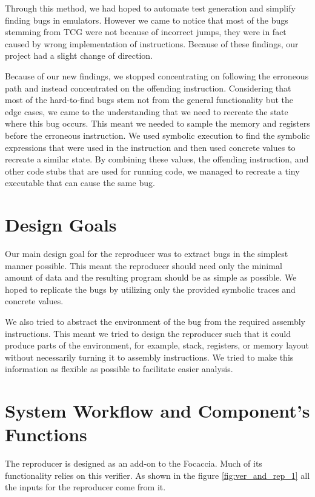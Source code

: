 Through this method, we had hoped to automate test generation and simplify finding bugs in emulators.
However we came to notice that most of the bugs stemming from \ac{TCG} were not because of incorrect jumps, they were in fact caused by wrong implementation of instructions.
Because of these findings, our project had a slight change of direction.

Because of our new findings, we stopped concentrating on following the erroneous path and instead concentrated on the offending instruction.
Considering that most of the hard-to-find bugs stem not from the general functionality but the edge cases, we came to the understanding that we need to recreate the state where this bug occurs.
This meant we needed to sample the memory and registers before the erroneous instruction.
We used symbolic execution to find the symbolic expressions that were used in the instruction and then used concrete values to recreate a similar state.
By combining these values, the offending instruction, and other code stubs that are used for running code, we managed to recreate a tiny executable that can cause the same bug.

\section{Design Goals}
Our main design goal for the reproducer was to extract bugs in the simplest manner possible.
This meant the reproducer should need only the minimal amount of data and the resulting program should be as simple as possible.
We hoped to replicate the bugs by utilizing only the provided symbolic traces and concrete values.

We also tried to abstract the environment of the bug from the required assembly instructions.
This meant we tried to design the reproducer such that it could produce parts of the environment, for example, stack, registers, or memory layout without necessarily turning it to assembly instructions.
We tried to make this information as flexible as possible to facilitate easier analysis.

\section{System Workflow and Component's Functions}
The reproducer is designed as an add-on to the Focaccia.
Much of its functionality relies on this verifier.
As shown in the figure \ref{fig:ver_and_rep_1} all the inputs for the reproducer come from it.

